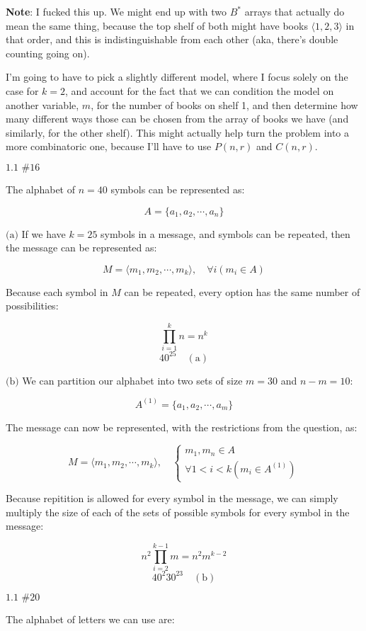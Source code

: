 \documentclass{article}
\newcommand{\problem}[2]{$\boxed{\text{#1 \##2}}$}
\newcommand{\subproblem}[1]{$\boxed{\text{(#1)}}$}
\newcommand{\subsolution}[2]{\boxed{#2\quad(\text{#1})}}
\begin{document}
\begin{multicols*}{2}
\textbf{Note}: I fucked this up. We might end up with two $B^*$ arrays
that actually do mean the same thing, because the top shelf of both
might have books $\langle{}1,2,3\rangle$ in that order, and this is
indistinguishable from each other (aka, there's double counting going
on).

I'm going to have to pick a slightly different model, where I focus
solely on the case for $k=2$, and account for the fact that we can
condition the model on another variable, $m$, for the number of books
on shelf 1, and then determine how many different ways those can be
chosen from the array of books we have (and similarly, for the other
shelf). This might actually help turn the problem into a more
combinatoric one, because I'll have to use $P(n,r)$ and $C(n,r)$.

%
\problem{1.1}{16}

The alphabet of $n=40$ symbols can be represented as:

\[
A=\{a_1,a_2,\cdots,a_n\}
\]

%
\subproblem{a} If we have $k=25$ symbols in a message, and symbols can
be repeated, then the message can be represented as:

\[
M=\langle m_1,m_2,\cdots,m_k\rangle,\quad \forall i(m_i\in A)
\]

Because each symbol in $M$ can be repeated, every option has the same
number of possibilities:

\[
\prod\limits_{i=1}^k n=n^k
\] \[
\subsolution{a}{40^{25}}
\]

\subproblem{b} We can partition our alphabet into two sets of size
$m=30$ and $n-m=10$:

\[
A^{(1)}=\{a_1,a_2,\cdots,a_m\}
\]

The message can now be represented, with the restrictions from the
question, as:

\[
M=\langle m_1,m_2,\cdots,m_k\rangle,\quad\begin{cases}m_1,m_n\in A \\ \forall 1<i<k(m_i\in A^{(1)})\end{cases}
\]

Because repitition is allowed for every symbol in the message, we can
simply multiply the size of each of the sets of possible symbols for
every symbol in the message:

\[
n^2\prod\limits_{i=2}^{k-1} m=n^2m^{k-2}
\] \[
\subsolution{b}{40^2 30^{23}}
\]

%
\problem{1.1}{20}

The alphabet of letters we can use are:


\end{multicols*}
\end{document}
